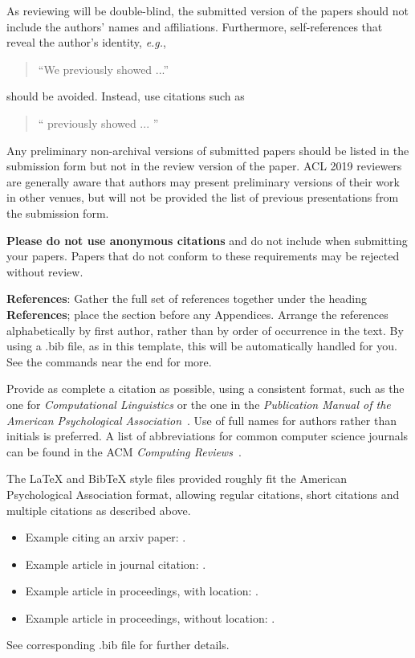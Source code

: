 \documentclass[11pt,a4paper]{article}
\begin{document}
As reviewing will be double-blind, the submitted version of the papers
should not include the authors' names and affiliations. Furthermore,
self-references that reveal the author's identity, \emph{e.g.},
\begin{quote}
``We previously showed \cite{Gusfield:97} ...''  
\end{quote}
should be avoided. Instead, use citations such as 
\begin{quote}
``\citeauthor{Gusfield:97} 
previously showed ... ''
\end{quote}

Any preliminary non-archival versions of submitted papers should be listed in the submission form but not in the review version of the paper. ACL 2019 reviewers are generally aware that authors may present preliminary versions of their work in other venues, but will not be provided the list of previous presentations from the submission form. 


\textbf{Please do not use anonymous citations} and do not include
 when submitting your papers. Papers that do not
conform to these requirements may be rejected without review.

\textbf{References}: Gather the full set of references together under
the heading \textbf{References}; place the section before any Appendices. 
Arrange the references alphabetically
by first author, rather than by order of occurrence in the text.
By using a .bib file, as in this template, this will be automatically 
handled for you. See the \verb|| commands near the end for more.

Provide as complete a citation as possible, using a consistent format,
such as the one for \emph{Computational Linguistics\/} or the one in the 
\emph{Publication Manual of the American 
Psychological Association\/}~\cite{APA:83}. Use of full names for
authors rather than initials is preferred. A list of abbreviations
for common computer science journals can be found in the ACM 
\emph{Computing Reviews\/}~\cite{ACM:83}.

The \LaTeX{} and Bib\TeX{} style files provided roughly fit the
American Psychological Association format, allowing regular citations, 
short citations and multiple citations as described above.  

\begin{itemize}
\item Example citing an arxiv paper: \cite{rasooli-tetrault-2015}. 
\item Example article in journal citation: \cite{Ando2005}.
\item Example article in proceedings, with location: \cite{borsch2011}.
\item Example article in proceedings, without location: \cite{andrew2007scalable}.
\end{itemize}
See corresponding .bib file for further details.
\end{document}
